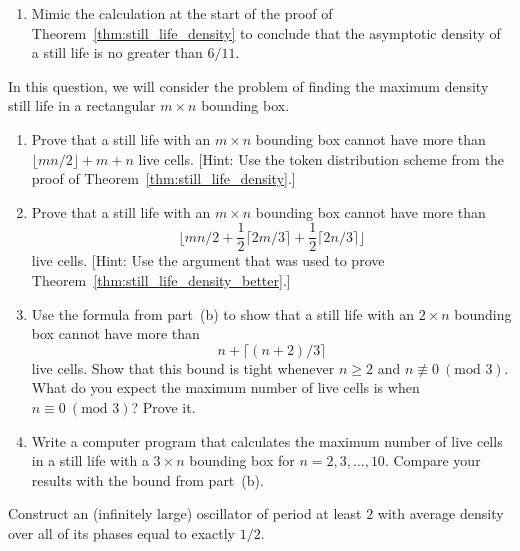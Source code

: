 \begin{multicols}{2}
\begin{problemstar}
\begin{enumerate}[label=\bf\color{ocre}(\alph*)]
			\item Mimic the calculation at the start of the proof of Theorem~\ref{thm:still_life_density} to conclude that the asymptotic density of a still life is no greater than $6/11$.
		\end{enumerate}
	\end{problemstar}
	
	
	\mfilbreak
	
	
	\begin{problem}\label{exer:still_life_density_rectangle}
		In this question, we will consider the problem of finding the maximum density still life in a rectangular $m \times n$ bounding box.\smallskip
		
		\begin{enumerate}[label=\bf\color{ocre}(\alph*)]
			\item Prove that a still life with an $m \times n$ bounding box cannot have more than $\lfloor mn/2 \rfloor + m + n$ live cells. [Hint: Use the token distribution scheme from the proof of Theorem~\ref{thm:still_life_density}.]
			
			\item Prove that a still life with an $m \times n$ bounding box cannot have more than $$\Big\lfloor mn/2 + \frac{1}{2}\lceil 2m/3 \rceil + \frac{1}{2}\lceil 2n/3 \rceil \Big\rfloor$$ live cells. [Hint: Use the argument that was used to prove Theorem~\ref{thm:still_life_density_better}.]
			
			\item Use the formula from part~(b) to show that a still life with an $2 \times n$ bounding box cannot have more than
			$$
			n + \big\lceil(n+2)/3\big\rceil
			$$
			live cells. Show that this bound is tight whenever $n \geq 2$ and $n \not\equiv 0 \ (\text{mod } 3)$. What do you expect the maximum number of live cells is when $n \equiv 0 \ (\text{mod } 3)$? Prove it.
			
			\item Write a computer program that calculates the maximum number of live cells in a still life with a $3 \times n$ bounding box for $n = 2, 3, \ldots, 10$. Compare your results with the bound from part~(b).
		\end{enumerate}
	\end{problem}
	
	
	\mfilbreak
	
	
	\begin{problem}\label{exer:dense_oscillator}
		Construct an (infinitely large) oscillator of period at least $2$ with average density over all of its phases equal to exactly $1/2$.
	\end{problem}
	
\end{multicols}
\normalsize\vspace*{0.01cm}
